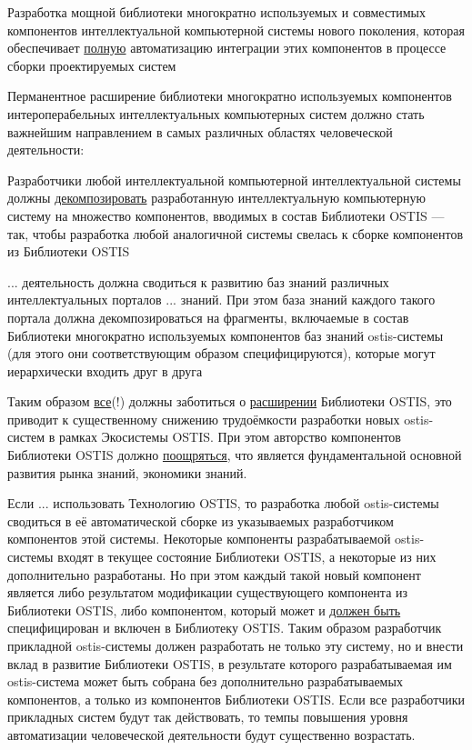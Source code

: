 \begin{textitemize}
	\item Разработка мощной библиотеки многократно используемых и совместимых компонентов интеллектуальной компьютерной системы нового поколения, которая обеспечивает \uline{полную} автоматизацию интеграции этих компонентов в процессе сборки проектируемых систем
	\item Перманентное расширение библиотеки многократно используемых компонентов интероперабельных интеллектуальных компьютерных систем должно стать важнейшим направлением в самых различных областях человеческой деятельности:
	\begin{textitemize}
		\item Разработчики любой интеллектуальной компьютерной интеллектуальной системы должны \uline{декомпозировать} разработанную интеллектуальную компьютерную систему на множество компонентов, вводимых в состав Библиотеки OSTIS --- так, чтобы разработка любой аналогичной системы свелась к сборке компонентов из Библиотеки OSTIS
		\item ... деятельность должна сводиться к развитию баз знаний различных интеллектуальных порталов ... знаний. При этом база знаний каждого такого портала должна декомпозироваться на фрагменты, включаемые в состав Библиотеки многократно используемых компонентов баз знаний ostis-системы (для этого они соответствующим образом специфицируются), которые могут иерархически входить друг в друга
		\item Таким образом \uline{все}(!) должны заботиться о \uline{расширении} Библиотеки OSTIS, это приводит к существенному снижению трудоёмкости разработки новых ostis-систем в рамках Экосистемы OSTIS. При этом авторство компонентов Библиотеки OSTIS должно \uline{поощряться}, что является фундаментальной основной развития рынка знаний, экономики знаний.  
	\end{textitemize}
\end{textitemize}

Если ... использовать Технологию OSTIS, то разработка любой ostis-системы сводиться в её автоматической сборке из указываемых разработчиком компонентов этой системы. Некоторые компоненты разрабатываемой ostis-системы входят в текущее состояние Библиотеки OSTIS, а некоторые из них дополнительно разработаны. Но при этом каждый такой новый компонент является либо результатом модификации существующего компонента из Библиотеки OSTIS, либо компонентом, который может и \uline{должен быть} специфицирован и включен в Библиотеку OSTIS. Таким образом разработчик прикладной ostis-системы должен разработать не только эту систему, но и внести вклад в развитие Библиотеки OSTIS, в результате которого разрабатываемая им ostis-система может быть собрана без дополнительно разрабатываемых компонентов, а только из компонентов Библиотеки OSTIS. Если все разработчики прикладных систем будут так действовать, то темпы повышения уровня автоматизации человеческой деятельности будут существенно возрастать.



